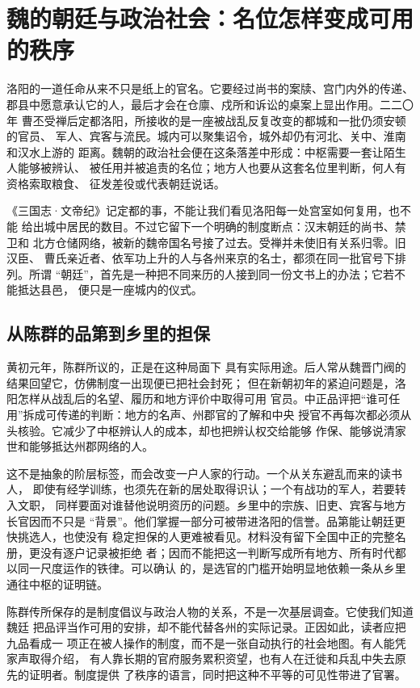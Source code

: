 \section{魏的朝廷与政治社会：名位怎样变成可用的秩序}

洛阳的一道任命从来不只是纸上的官名。它要经过尚书的案牍、宫门内外的传递、
郡县中愿意承认它的人，最后才会在仓廪、戍所和诉讼的桌案上显出作用。二二〇年
曹丕受禅后定都洛阳，所接收的是一座被战乱反复改变的都城和一批仍须安顿的官员、
军人、宾客与流民。城内可以聚集诏令，城外却仍有河北、关中、淮南和汉水上游的
距离。魏朝的政治社会便在这条落差中形成：中枢需要一套让陌生人能够被辨认、
被任用并被追责的名位；地方人也要从这套名位里判断，何人有资格索取粮食、
征发差役或代表朝廷说话。

《三国志·文帝纪》记定都的事，不能让我们看见洛阳每一处宫室如何复用，也不能
给出城中居民的数目。不过它留下一个明确的制度断点：汉末朝廷的尚书、禁卫和
北方仓储网络，被新的魏帝国名号接了过去。受禅并未使旧有关系归零。旧汉臣、
曹氏亲近者、依军功上升的人与各州来京的名士，都须在同一批官号下排列。所谓
“朝廷”，首先是一种把不同来历的人接到同一份文书上的办法；它若不能抵达县邑，
便只是一座城内的仪式。

\subsection{从陈群的品第到乡里的担保}

黄初元年，陈群所议的，正是在这种局面下
具有实际用途。后人常从魏晋门阀的结果回望它，仿佛制度一出现便已把社会封死；
但在新朝初年的紧迫问题是，洛阳怎样从战乱后的名望、履历和地方评价中取得可用
官员。中正品评把“谁可任用”拆成可传递的判断：地方的名声、州郡官的了解和中央
授官不再每次都必须从头核验。它减少了中枢辨认人的成本，却也把辨认权交给能够
作保、能够说清家世和能够抵达州郡网络的人。

这不是抽象的阶层标签，而会改变一户人家的行动。一个从关东避乱而来的读书人，
即使有经学训练，也须先在新的居处取得识认；一个有战功的军人，若要转入文职，
同样要面对谁替他说明资历的问题。乡里中的宗族、旧吏、宾客与地方长官因而不只是
“背景”。他们掌握一部分可被带进洛阳的信誉。品第能让朝廷更快挑选人，也使没有
稳定担保的人更难被看见。材料没有留下全国中正的完整名册，更没有逐户记录被拒绝
者；因而不能把这一判断写成所有地方、所有时代都以同一尺度运作的铁律。可以确认
的，是选官的门槛开始明显地依赖一条从乡里通往中枢的证明链。

陈群传所保存的是制度倡议与政治人物的关系，不是一次基层调查。它使我们知道魏廷
把品评当作可用的安排，却不能代替各州的实际记录。正因如此，读者应把九品看成一
项正在被人操作的制度，而不是一张自动执行的社会地图。有人能凭家声取得介绍，
有人靠长期的官府服务累积资望，也有人在迁徙和兵乱中失去原先的证明者。制度提供
了秩序的语言，同时把这种不平等的可见性带进了官署。

